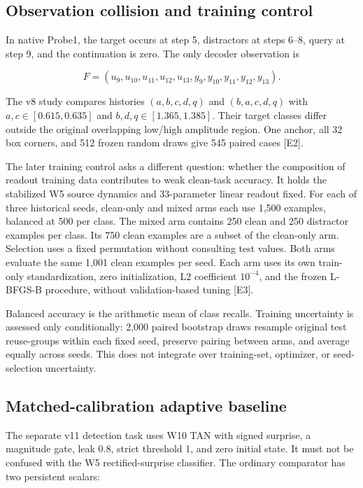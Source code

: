 \documentclass[
  10pt,
]{article}
\begin{document}
\subsection{Observation collision and training
control}\label{observation-collision-and-training-control}

In native Probe1, the target occurs at step 5, distractors at steps
6--8, query at step 9, and the continuation is zero. The only decoder
observation is

\[F=(u_9,u_{10},u_{11},u_{12},u_{13},y_9,y_{10},y_{11},y_{12},y_{13}).\]

The v8 study compares histories \((a,b,c,d,q)\) and \((b,a,c,d,q)\) with
\(a,c\in[0.615,0.635]\) and \(b,d,q\in[1.365,1.385]\). Their target
classes differ outside the original overlapping low/high amplitude
region. One anchor, all 32 box corners, and 512 frozen random draws give
545 paired cases {[}E2{]}.

The later training control asks a different question: whether the
composition of readout training data contributes to weak clean-task
accuracy. It holds the stabilized W5 source dynamics and 33-parameter
linear readout fixed. For each of three historical seeds, clean-only and
mixed arms each use 1,500 examples, balanced at 500 per class. The mixed
arm contains 250 clean and 250 distractor examples per class. Its 750
clean examples are a subset of the clean-only arm. Selection uses a
fixed permutation without consulting test values. Both arms evaluate the
same 1,001 clean examples per seed. Each arm uses its own train-only
standardization, zero initialization, L2 coefficient \(10^{-4}\), and
the frozen L-BFGS-B procedure, without validation-based tuning {[}E3{]}.

Balanced accuracy is the arithmetic mean of class recalls. Training
uncertainty is assessed only conditionally: 2,000 paired bootstrap draws
resample original test reuse-groups within each fixed seed, preserve
pairing between arms, and average equally across seeds. This does not
integrate over training-set, optimizer, or seed-selection uncertainty.

\subsection{Matched-calibration adaptive
baseline}\label{matched-calibration-adaptive-baseline}

The separate v11 detection task uses W10 TAN with signed surprise, a
magnitude gate, leak 0.8, strict threshold 1, and zero initial state. It
must not be confused with the W5 rectified-surprise classifier. The
ordinary comparator has two persistent scalars:
\end{document}
